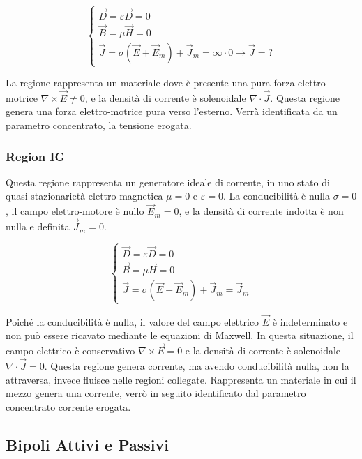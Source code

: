 \documentclass{article}
\numberwithin{equation}{subsection}
\begin{document}
\begin{equation*}
    \begin{cases}
        \vec{D}=\varepsilon\vec{D}=0\\
        \vec{B}=\mu\vec{H}=0\\
        \vec{J}=\sigma(\vec{E}+\vec{E}_m)+\vec{J}_m=\infty\cdot0\to\vec{J}=?
    \end{cases}
\end{equation*}

La regione rappresenta un materiale dove è presente una pura forza elettro-motrice $\nabla\times\vec{E}\neq0$, e la densità di corrente è solenoidale $\nabla\cdot\vec{J}$. 
Questa regione genera una forza elettro-motrice pura verso l'esterno. 
Verrà identificata da un parametro concentrato, la tensione erogata.

\subsubsection{Region IG}

Questa regione rappresenta un generatore ideale di corrente, in uno stato di quasi-stazionarietà elettro-magnetica $\mu=0$ e $\varepsilon=0$. La conducibilità è nulla $\sigma=0$, 
il campo elettro-motore è nullo $\vec{E}_m=0$, e la densità di corrente indotta è non nulla e definita $\vec{J}_m=0$. 

\begin{equation*}
    \begin{cases}
        \vec{D}=\varepsilon\vec{D}=0\\
        \vec{B}=\mu\vec{H}=0\\
        \vec{J}=\sigma(\vec{E}+\vec{E}_m)+\vec{J}_m=\vec{J}_m
    \end{cases}
\end{equation*}

Poiché la conducibilità è nulla, il valore del campo elettrico $\vec{E}$ è indeterminato e non può essere ricavato mediante le equazioni di Maxwell. In 
questa situazione, il campo elettrico è conservativo $\nabla\times\vec{E}=0$ e la densità di corrente è solenoidale $\nabla\cdot\vec{J}=0$. 
Questa regione genera corrente, ma avendo conducibilità nulla, non la attraversa, invece fluisce nelle regioni collegate. Rappresenta un materiale in cui il 
mezzo genera una corrente, verrò in seguito identificato dal parametro concentrato corrente erogata.

\subsection{Bipoli Attivi e Passivi}
\end{document}

